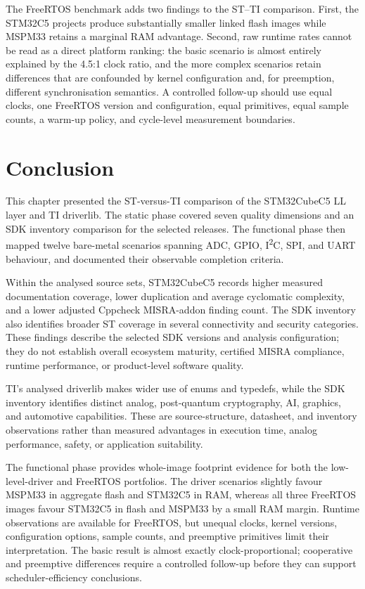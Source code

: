 The FreeRTOS benchmark adds two findings to the ST--TI comparison. First, the STM32C5 projects
produce substantially smaller linked flash images while MSPM33 retains a marginal RAM
advantage. Second, raw runtime rates cannot be read as a direct platform ranking: the basic
scenario is almost entirely explained by the 4.5:1 clock ratio, and the more complex scenarios
retain differences that are confounded by kernel configuration and, for preemption, different
synchronisation semantics. A controlled follow-up should use equal clocks, one FreeRTOS version
and configuration, equal primitives, equal sample counts, a warm-up policy, and cycle-level
measurement boundaries.


\newpage
\section*{Conclusion}
This chapter presented the ST-versus-TI comparison of the STM32CubeC5 LL layer and TI
driverlib. The static phase covered seven quality dimensions and an SDK inventory comparison
for the selected releases. The functional phase then mapped twelve bare-metal scenarios spanning ADC, GPIO,
I\textsuperscript{2}C, SPI, and UART behaviour, and documented their observable completion
criteria.

Within the analysed source sets, STM32CubeC5 records higher measured documentation coverage,
lower duplication and average cyclomatic complexity, and a lower adjusted Cppcheck
MISRA-addon finding count. The SDK inventory also identifies broader ST coverage in several
connectivity and security categories. These findings describe the selected SDK versions and
analysis configuration; they do not establish overall ecosystem maturity, certified MISRA
compliance, runtime performance, or product-level software quality.

TI's analysed driverlib makes wider use of enums and typedefs, while the SDK inventory
identifies distinct analog, post-quantum cryptography, AI, graphics, and automotive
capabilities. These are source-structure, datasheet, and inventory observations rather than
measured advantages in execution time, analog performance, safety, or application
suitability.

The functional phase provides whole-image footprint evidence for both the low-level-driver and
FreeRTOS portfolios. The driver scenarios slightly favour MSPM33 in aggregate flash and STM32C5
in RAM, whereas all three FreeRTOS images favour STM32C5 in flash and MSPM33 by a small RAM
margin. Runtime observations are available for FreeRTOS, but unequal clocks, kernel versions,
configuration options, sample counts, and preemptive primitives limit their interpretation.
The basic result is almost exactly clock-proportional; cooperative and preemptive differences
require a controlled follow-up before they can support scheduler-efficiency conclusions.